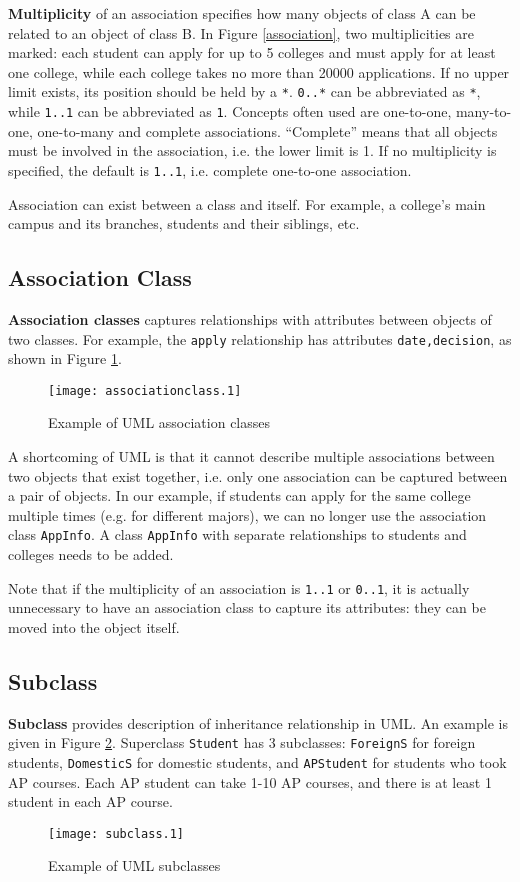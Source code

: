 \textbf{Multiplicity} of an association specifies how many objects of class A can be related to an object of class B. In Figure \ref{association}, two multiplicities are marked: each student can apply for up to 5 colleges and must apply for at least one college, while each college takes no more than 20000 applications. If no upper limit exists, its position should be held by a \texttt{*}. \texttt{0..*} can be abbreviated as \texttt{*}, while \texttt{1..1} can be abbreviated as \texttt{1}. Concepts often used are one-to-one, many-to-one, one-to-many and complete associations. ``Complete'' means that all objects must be involved in the association, i.e. the lower limit is 1. If no multiplicity is specified, the default is \texttt{1..1}, i.e. complete one-to-one association.

Association can exist between a class and itself. For example, a college's main campus and its branches, students and their siblings, etc. 
\subsection{Association Class}
\textbf{Association classes} captures relationships with attributes between objects of two classes. For example, the \texttt{apply} relationship has attributes \texttt{date,decision}, as shown in Figure \ref{associationclass}. 
\begin{figure}[ht]
\centering
\texttt{[image: associationclass.1]}
\caption{Example of UML association classes}\label{associationclass}
\end{figure}

A shortcoming of UML is that it cannot describe multiple associations between two objects that exist together, i.e. only one association can be captured between a pair of objects. In our example, if students can apply for the same college multiple times (e.g. for different majors), we can no longer use the association class \texttt{AppInfo}. A class \texttt{AppInfo} with separate relationships to students and colleges needs to be added. 

Note that if the multiplicity of an association is \texttt{1..1} or \texttt{0..1}, it is actually unnecessary to have an association class to capture its attributes: they can be moved into the object itself.  
\subsection{Subclass} 
\textbf{Subclass} provides description of inheritance relationship in UML. An example is given in Figure \ref{subclass}. Superclass \texttt{Student} has 3 subclasses: \texttt{ForeignS} for foreign students, \texttt{DomesticS} for domestic students, and \texttt{APStudent} for students who took AP courses. Each AP student can take 1-10 AP courses, and there is at least 1 student in each AP course.
\begin{figure}[ht]
\centering
\texttt{[image: subclass.1]}
\caption{Example of UML subclasses}\label{subclass}
\end{figure}

